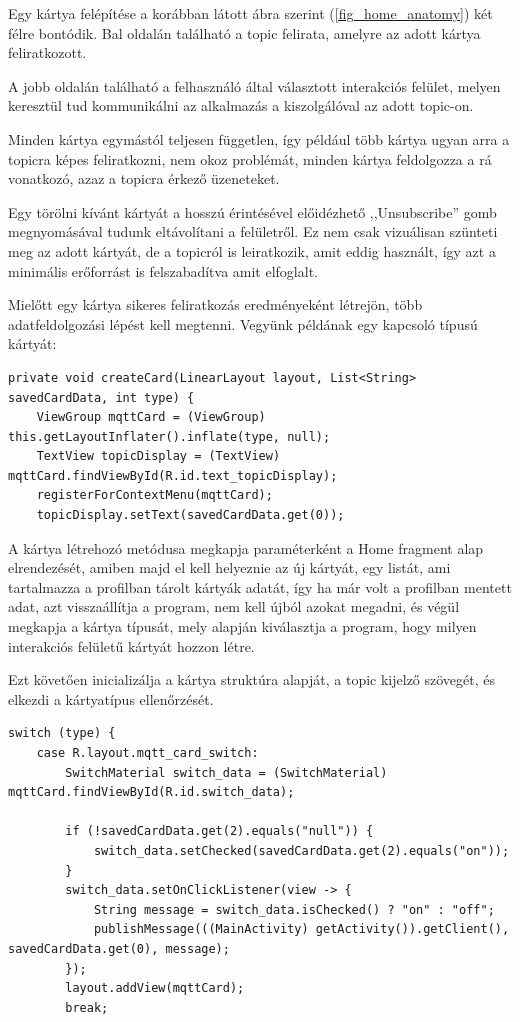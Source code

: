 \documentclass[
]{thesis-ekf}
\theoremstyle{definition}
\theoremstyle{remark}
\begin{document}
Egy kártya felépítése a korábban látott ábra szerint (\ref{fig_home_anatomy}) két félre bontódik.
Bal oldalán található a topic felirata, amelyre az adott kártya feliratkozott. 

A jobb oldalán található
a felhasználó által választott interakciós felület, melyen keresztül tud kommunikálni az alkalmazás a
kiszolgálóval az adott topic-on. 

Minden kártya egymástól teljesen független, így például több kártya ugyan
arra a topicra képes feliratkozni, nem okoz problémát, minden kártya feldolgozza a rá vonatkozó,
azaz a topicra érkező üzeneteket.

Egy törölni kívánt kártyát a hosszú érintésével előidézhető ,,Unsubscribe'' gomb megnyomásával tudunk
eltávolítani a felületről. Ez nem csak vizuálisan szünteti meg az adott kártyát, de a topicról is
leiratkozik, amit eddig használt, így azt a minimális erőforrást is felszabadítva amit elfoglalt. 

Mielőtt egy kártya sikeres feliratkozás eredményeként létrejön, több adatfeldolgozási lépést kell megtenni. 
Vegyünk példának egy kapcsoló típusú kártyát:


\lstset{language=Java}  
\begin{lstlisting}[frame=single]
private void createCard(LinearLayout layout, List<String> savedCardData, int type) {
    ViewGroup mqttCard = (ViewGroup) this.getLayoutInflater().inflate(type, null);
    TextView topicDisplay = (TextView) mqttCard.findViewById(R.id.text_topicDisplay);
    registerForContextMenu(mqttCard);
    topicDisplay.setText(savedCardData.get(0));
\end{lstlisting}

A kártya létrehozó metódusa megkapja paraméterként a Home fragment alap elrendezését, amiben majd el kell
helyeznie az új kártyát, egy listát, ami tartalmazza a profilban tárolt kártyák adatát, így ha már
volt a profilban mentett adat, azt visszaállítja a program, nem kell újból azokat megadni, és végül
megkapja a kártya típusát, mely alapján kiválasztja a program, hogy milyen interakciós felületű kártyát
hozzon létre.

Ezt követően inicializálja a kártya struktúra alapját, a topic kijelző szövegét, és elkezdi a kártyatípus ellenőrzését.

\lstset{language=Java}  
\begin{lstlisting}[frame=single]
switch (type) {
	case R.layout.mqtt_card_switch:
		SwitchMaterial switch_data = (SwitchMaterial) mqttCard.findViewById(R.id.switch_data);

		if (!savedCardData.get(2).equals("null")) {
			switch_data.setChecked(savedCardData.get(2).equals("on"));
		}
		switch_data.setOnClickListener(view -> {
			String message = switch_data.isChecked() ? "on" : "off";
			publishMessage(((MainActivity) getActivity()).getClient(), savedCardData.get(0), message);
		});
		layout.addView(mqttCard);
		break;
\end{lstlisting}
\end{document}

